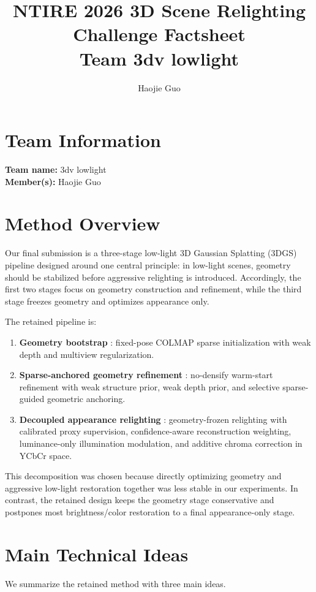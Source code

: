 \documentclass[10pt,a4paper]{article}
\title{\textbf{NTIRE 2026 3D Scene Relighting Challenge Factsheet}\\
\large Team 3dv lowlight}
\author{Haojie Guo}
\date{}
\begin{document}
\maketitle

\section{Team Information}
\textbf{Team name:} 3dv lowlight\\
\textbf{Member(s):} Haojie Guo

\section{Method Overview}
Our final submission is a three-stage low-light 3D Gaussian Splatting (3DGS) pipeline designed around one central principle: in low-light scenes, geometry should be stabilized before aggressive relighting is introduced. Accordingly, the first two stages focus on geometry construction and refinement, while the third stage freezes geometry and optimizes appearance only.

The retained pipeline is:
\begin{enumerate}[leftmargin=2em]
  \item \textbf{Geometry bootstrap} : fixed-pose COLMAP sparse initialization with weak depth and multiview regularization.
  \item \textbf{Sparse-anchored geometry refinement} : no-densify warm-start refinement with weak structure prior, weak depth prior, and selective sparse-guided geometric anchoring.
  \item \textbf{Decoupled appearance relighting} : geometry-frozen relighting with calibrated proxy supervision, confidence-aware reconstruction weighting, luminance-only illumination modulation, and additive chroma correction in YCbCr space.
\end{enumerate}

This decomposition was chosen because directly optimizing geometry and aggressive low-light restoration together was less stable in our experiments. In contrast, the retained design keeps the geometry stage conservative and postpones most brightness/color restoration to a final appearance-only stage.

\section{Main Technical Ideas}
We summarize the retained method with three main ideas.
\end{document}

